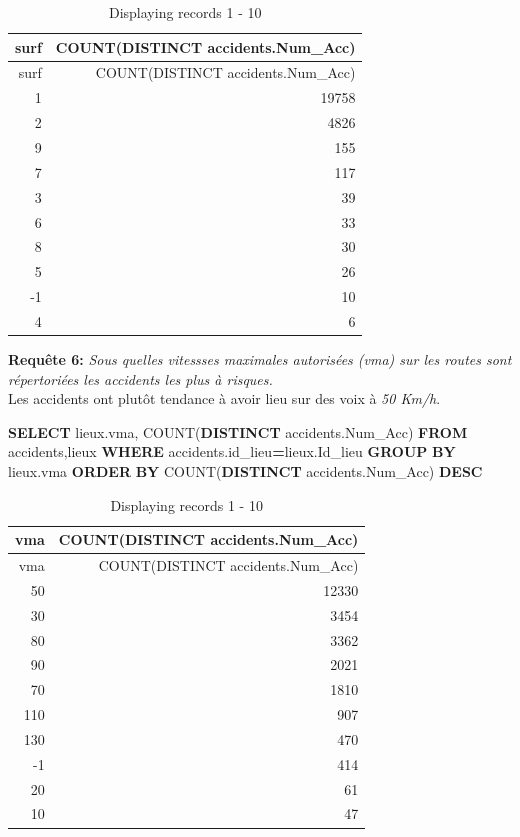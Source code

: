 \documentclass[mstat,12pt]{unswthesis}
\newenvironment{Shaded}{\begin{snugshade}}{\end{snugshade}}
\newcommand{\FunctionTok}[1]{\textcolor[rgb]{0.00,0.00,0.00}{#1}}
\newcommand{\KeywordTok}[1]{\textcolor[rgb]{0.13,0.29,0.53}{\textbf{#1}}}
\newcommand{\NormalTok}[1]{#1}
\newcommand{\OperatorTok}[1]{\textcolor[rgb]{0.81,0.36,0.00}{\textbf{#1}}}
\begin{document}
\begin{longtable}[]{@{}rr@{}}
\caption{Displaying records 1 - 10}\tabularnewline
\toprule()
surf & COUNT(DISTINCT accidents.Num\_Acc) \\
\midrule()
\endfirsthead
\toprule()
surf & COUNT(DISTINCT accidents.Num\_Acc) \\
\midrule()
\endhead
1 & 19758 \\
2 & 4826 \\
9 & 155 \\
7 & 117 \\
3 & 39 \\
6 & 33 \\
8 & 30 \\
5 & 26 \\
-1 & 10 \\
4 & 6 \\
\bottomrule()
\end{longtable}

\medskip

\textbf{Requête 6:} \emph{Sous quelles vitessses maximales autorisées
(vma) sur les routes sont répertoriées les accidents les plus à
risques.}\\
Les accidents ont plutôt tendance à avoir lieu sur des voix à \emph{50
Km/h}.

\begin{Shaded}
\begin{Highlighting}[]
\KeywordTok{SELECT}\NormalTok{ lieux.vma, }\FunctionTok{COUNT}\NormalTok{(}\KeywordTok{DISTINCT}\NormalTok{ accidents.Num\_Acc) }
\KeywordTok{FROM}\NormalTok{ accidents,lieux }
\KeywordTok{WHERE}\NormalTok{ accidents.id\_lieu}\OperatorTok{=}\NormalTok{lieux.Id\_lieu }
\KeywordTok{GROUP} \KeywordTok{BY}\NormalTok{ lieux.vma }
\KeywordTok{ORDER} \KeywordTok{BY}\NormalTok{ \textasciigrave{}COUNT(}\KeywordTok{DISTINCT}\NormalTok{ accidents.Num\_Acc)\textasciigrave{} }\KeywordTok{DESC}
\end{Highlighting}
\end{Shaded}

\begin{longtable}[]{@{}rr@{}}
\caption{Displaying records 1 - 10}\tabularnewline
\toprule()
vma & COUNT(DISTINCT accidents.Num\_Acc) \\
\midrule()
\endfirsthead
\toprule()
vma & COUNT(DISTINCT accidents.Num\_Acc) \\
\midrule()
\endhead
50 & 12330 \\
30 & 3454 \\
80 & 3362 \\
90 & 2021 \\
70 & 1810 \\
110 & 907 \\
130 & 470 \\
-1 & 414 \\
20 & 61 \\
10 & 47 \\
\bottomrule()
\end{longtable}
\end{document}
